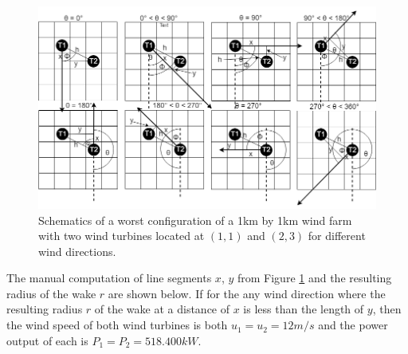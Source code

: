     \begin{figure}[H]
        \centering
        \includegraphics[width=\linewidth]{Figures/1123.png}
        \caption{Schematics of a worst configuration of a 1km by 1km wind farm with two wind turbines located at $(1,1)$ and $(2,3)$ for different wind directions.}
        \label{sampleSmall4}
    \end{figure}
    
    The manual computation of line segments $x$, $y$ from Figure \ref{sampleSmall4} and the resulting radius of the wake $r$ are shown below. If for the any wind direction where the resulting radius $r$ of the wake at a distance of $x$ is less than the length of $y$, then the wind speed of both wind turbines is both $u_1=u_2=12m/s$ and the power output of each is $P_1=P_2=518.400kW$.

